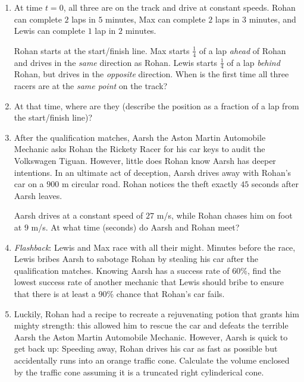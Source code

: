 \documentclass[a4paper]{article}
\begin{document}
    
    \begin{enumerate}[itemsep=2.3cm]
    
    \item At time $t=0$, all three are on the track and drive at constant speeds.
    Rohan can complete $2$ laps in $5$ minutes, Max can complete $2$ laps in $3$ minutes, and Lewis can complete $1$ lap in $2$ minutes.
    \vspace{0.3cm}
    
    Rohan starts at the start/finish line. Max starts $\tfrac14$ of a lap \emph{ahead} of Rohan and drives in the \emph{same} direction as Rohan. Lewis starts $\tfrac14$ of a lap \emph{behind} Rohan, but drives in the \emph{opposite} direction. When is the first time all three racers are at the \emph{same point} on the track?
    
    \item At that time, where are they (describe the position as a fraction of a lap from the start/finish line)?

    \item After the qualification matches, Aarsh the Aston Martin Automobile Mechanic asks Rohan the Rickety Racer for his car keys to audit the Volkswagen Tiguan. However, little does Rohan know Aarsh has deeper intentions. In an ultimate act of deception, Aarsh drives away with Rohan's car on a $900$ m circular road. Rohan notices the theft exactly $45$ seconds after Aarsh leaves.
    \vspace{0.3cm}
    
    Aarsh drives at a constant speed of $27$ m/s, while Rohan chases him on foot at $9$ m/s. At what time (seconds) do Aarsh and Rohan meet?

    \item \textit{Flashback}: Lewis and Max race with all their might. Minutes before the race, Lewis bribes Aarsh to sabotage Rohan by stealing his car after the qualification matches. Knowing Aarsh has a success rate of 60\%, find the lowest success rate of another mechanic that Lewis should bribe to ensure that there is at least a 90\% chance that Rohan's car fails.

    \item Luckily, Rohan had a recipe to recreate a rejuvenating potion that grants him mighty strength: this allowed him to rescue the car and defeats the terrible Aarsh the Aston Martin Automobile Mechanic. However, Aarsh is quick to get back up: Speeding away, Rohan drives his car as fast as possible but accidentally runs into an orange traffic cone. Calculate the volume enclosed by the traffic cone assuming it is a truncated right cylinderical cone. 


\end{enumerate}
\end{document}
